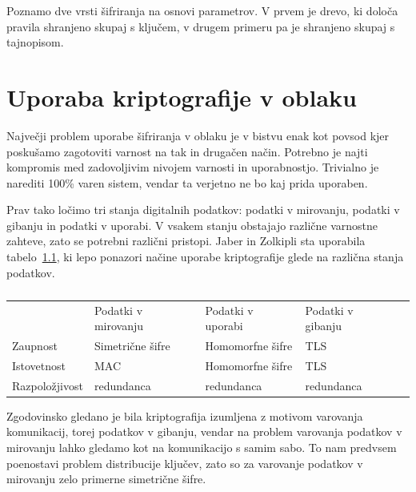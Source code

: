 \documentclass[12pt,a4paper,openany]{book}
\begin{document}
Poznamo dve vrsti šifriranja na osnovi parametrov. V prvem je drevo, ki določa pravila shranjeno skupaj s ključem, v drugem primeru pa je shranjeno skupaj s tajnopisom.

\chapter{Uporaba kriptografije v oblaku}

Največji problem uporabe šifriranja v oblaku je v bistvu enak kot povsod kjer poskušamo zagotoviti varnost na tak in drugačen način. Potrebno je najti kompromis med zadovoljivim nivojem varnosti in uporabnostjo. Trivialno je narediti 100\% varen sistem, vendar ta verjetno ne bo kaj prida uporaben.

Prav tako ločimo tri stanja digitalnih podatkov: podatki v mirovanju, podatki v gibanju in podatki v uporabi. V vsakem stanju obstajajo različne varnostne zahteve, zato se potrebni različni pristopi. Jaber in Zolkipli\cite{jaber2013use} sta uporabila tabelo~\ref{tbl:cloudtriad}, ki lepo ponazori načine uporabe kriptografije glede na različna stanja podatkov.

\begin{table}[]
  \centering
  \begin{tabular}{lllll}
                                        & Podatki v mirovanju                   & Podatki v uporabi                    & Podatki v gibanju              &  \\ \cline{2-4}
    \multicolumn{1}{l|}{Zaupnost}       & \multicolumn{1}{l|}{Simetrične šifre} & \multicolumn{1}{l|}{Homomorfne šifre} & \multicolumn{1}{l|}{TLS}        &  \\ \cline{2-4}
    \multicolumn{1}{l|}{Istovetnost}    & \multicolumn{1}{l|}{MAC}              & \multicolumn{1}{l|}{Homomorfne šifre} & \multicolumn{1}{l|}{TLS}        &  \\ \cline{2-4}
    \multicolumn{1}{l|}{Razpoložjivost} & \multicolumn{1}{l|}{redundanca}       & \multicolumn{1}{l|}{redundanca}       & \multicolumn{1}{l|}{redundanca} &  \\ \cline{2-4}
  \end{tabular}
  \caption{}
\label{tbl:cloudtriad}
\end{table}

Zgodovinsko gledano je bila kriptografija izumljena z motivom varovanja komunikacij, torej podatkov v gibanju, vendar na problem varovanja podatkov v mirovanju lahko gledamo kot na komunikacijo s samim sabo. To nam predvsem poenostavi problem distribucije ključev, zato so za varovanje podatkov v mirovanju zelo primerne simetrične šifre.
\end{document}
